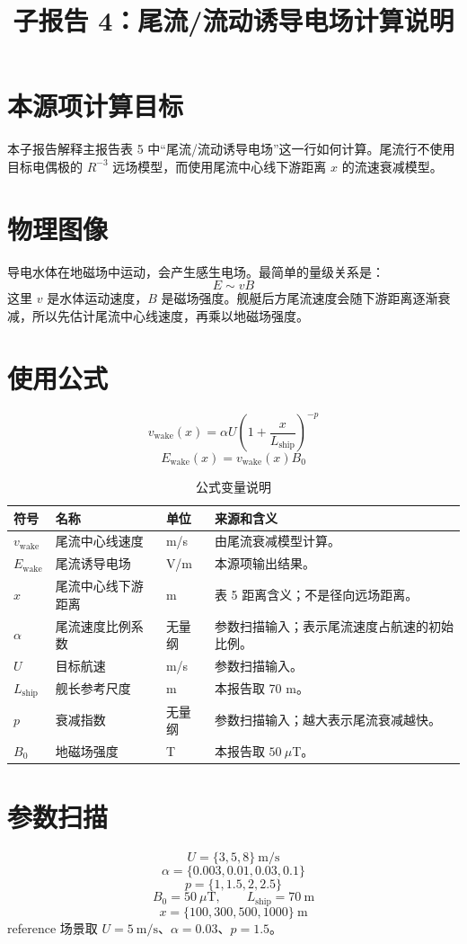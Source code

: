 \documentclass[UTF8,a4paper,11pt]{ctexart}
\title{子报告 4：尾流/流动诱导电场计算说明}
\author{}
\date{}
\begin{document}
\maketitle

\section{本源项计算目标}
本子报告解释主报告表 5 中“尾流/流动诱导电场”这一行如何计算。尾流行不使用目标电偶极的 $R^{-3}$ 远场模型，而使用尾流中心线下游距离 $x$ 的流速衰减模型。

\section{物理图像}
导电水体在地磁场中运动，会产生感生电场。最简单的量级关系是：
\[
E\sim vB
\]
这里 $v$ 是水体运动速度，$B$ 是磁场强度。舰艇后方尾流速度会随下游距离逐渐衰减，所以先估计尾流中心线速度，再乘以地磁场强度。

\section{使用公式}
\[
v_{\mathrm{wake}}(x)=\alpha U\left(1+\frac{x}{L_{\mathrm{ship}}}\right)^{-p}
\]
\[
E_{\mathrm{wake}}(x)=v_{\mathrm{wake}}(x)B_0
\]

\begin{longtable}{p{2.8cm}p{3.3cm}p{2.0cm}p{5.4cm}}
\caption{公式变量说明}\\
\toprule
符号 & 名称 & 单位 & 来源和含义\\
\midrule
$v_{\mathrm{wake}}$ & 尾流中心线速度 & m/s & 由尾流衰减模型计算。\\
$E_{\mathrm{wake}}$ & 尾流诱导电场 & V/m & 本源项输出结果。\\
$x$ & 尾流中心线下游距离 & m & 表 5 距离含义；不是径向远场距离。\\
$\alpha$ & 尾流速度比例系数 & 无量纲 & 参数扫描输入；表示尾流速度占航速的初始比例。\\
$U$ & 目标航速 & m/s & 参数扫描输入。\\
$L_{\mathrm{ship}}$ & 舰长参考尺度 & m & 本报告取 70 m。\\
$p$ & 衰减指数 & 无量纲 & 参数扫描输入；越大表示尾流衰减越快。\\
$B_0$ & 地磁场强度 & T & 本报告取 $50\ \mu$T。\\
\bottomrule
\end{longtable}

\section{参数扫描}
\[
U=\{3,5,8\}\ \mathrm{m/s}
\]
\[
\alpha=\{0.003,0.01,0.03,0.1\}
\]
\[
p=\{1,1.5,2,2.5\}
\]
\[
B_0=50\ \mu\mathrm{T},\qquad L_{\mathrm{ship}}=70\ \mathrm{m}
\]
\[
x=\{100,300,500,1000\}\ \mathrm{m}
\]
reference 场景取 $U=5\ \mathrm{m/s}$、$\alpha=0.03$、$p=1.5$。
\end{document}
